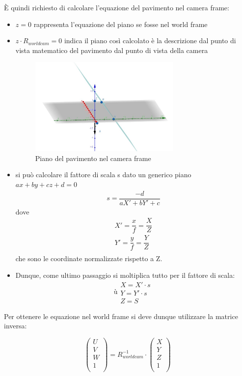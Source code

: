 È quindi richiesto di calcolare l'equazione del pavimento nel camera frame:
\begin{itemize}
	\item $z = 0$ rappresenta l'equazione del piano se fosse nel world frame
	\item $z \cdot R_{worldcam} = 0$ indica il piano così calcolato è la descrizione dal punto di vista matematico del pavimento dal punto di vista della camera
	\begin{figure}[H]
		\centering
		\includegraphics[width=0.7\textwidth]{Immagini/piano_camera.jpeg}
		\caption{Piano del pavimento nel camera frame}
		\label{fig:piano_camera}
	\end{figure}
	\item si può calcolare il fattore di scala s dato un generico piano $ax+by+cz+d=0$
		\begin{equation}
		\begin{split}
		s = \dfrac{-d}{aX'+bY'+c}	
		\end{split}
		\end{equation}
	dove
		\begin{equation}
		\begin{split}
		X'=\dfrac{x}{f}=\dfrac{X}{Z}\\
		Y'=\dfrac{y}{f}=\dfrac{Y}{Z} \\
		\end{split}
		\end{equation}
	che sono le coordinate normalizzate rispetto a Z.
	\item Dunque, come ultimo passaggio si moltiplica tutto per il fattore di scala:
		\begin{equation}ù
		\begin{split}
		X=X' \cdot s\\
		Y=Y' \cdot s\\
		Z=S
		\end{split}
		\end{equation}
\end{itemize}

Per ottenere le equazione nel world frame si deve dunque utilizzare la matrice inversa:

$$
\begin{pmatrix}
U  \\
V  \\
W  \\
1  \\
\end{pmatrix}
=R_{worldcam}^{-1}\cdot
\begin{pmatrix}
X  \\
Y  \\
Z  \\
1  \\
\end{pmatrix}
$$
